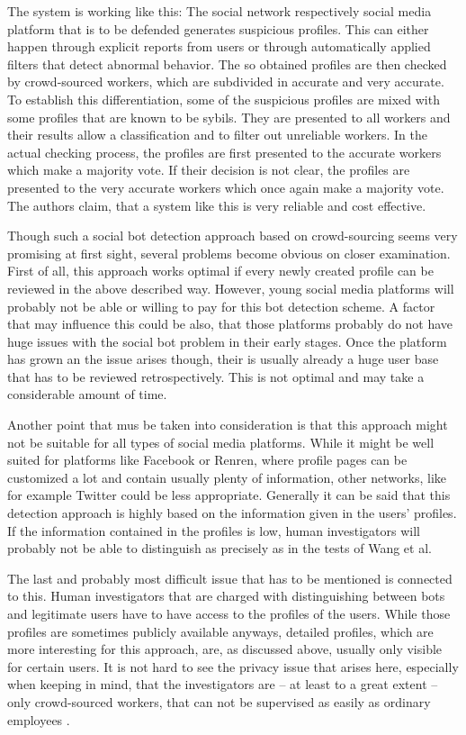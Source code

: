 The system is working like this: The social network respectively social media platform that is to be defended generates suspicious profiles. This can either happen through explicit reports from users or through automatically applied filters that detect abnormal behavior. The so obtained profiles are then checked by crowd-sourced workers, which are subdivided in accurate and very accurate. To establish this differentiation, some of the suspicious profiles are mixed with some profiles that are known to be sybils. They are presented to all workers and their results allow a classification and to filter out unreliable workers. In the actual checking process, the profiles are first presented to the accurate workers which make a majority vote. If their decision is not clear, the profiles are presented to the very accurate workers which once again make a majority vote. 
The authors claim, that a system like this is very reliable and cost effective. 

Though such a social bot detection approach based on crowd-sourcing seems very promising at first sight, several problems become obvious on closer examination. First of all, this approach works optimal if every newly created profile can be reviewed in the above described way. However, young social media platforms will probably not be able or willing to pay for this bot detection scheme. A factor that may influence this could be also, that those platforms probably do not have huge issues with the social bot problem in their early stages. Once the platform has grown an the issue arises though, their is usually already a huge user base that has to be reviewed retrospectively. This is not optimal and may take a considerable amount of time.

Another point that mus be taken into consideration is that this approach might not be suitable for all types of social media platforms. While it might be well suited for platforms like Facebook or Renren, where profile pages can be customized a lot and contain usually plenty of information, other networks, like for example Twitter could be less appropriate. Generally it can be said that this detection approach is highly based on the information given in the users' profiles. If the information contained in the profiles is low, human investigators will probably not be able to distinguish as precisely as in the tests of Wang et al.

The last and probably most difficult issue that has to be mentioned is connected to this. Human investigators that are charged with distinguishing between bots and legitimate users have to have access to the profiles of the users. While those profiles are sometimes publicly available anyways, detailed profiles, which are more interesting for this approach, are, as discussed above, usually only visible for certain users. It is not hard to see the privacy issue that arises here, especially when keeping in mind, that the investigators are -- at least to a great extent -- only crowd-sourced workers, that can not be supervised as easily as ordinary employees \cite{ferrara15}.


